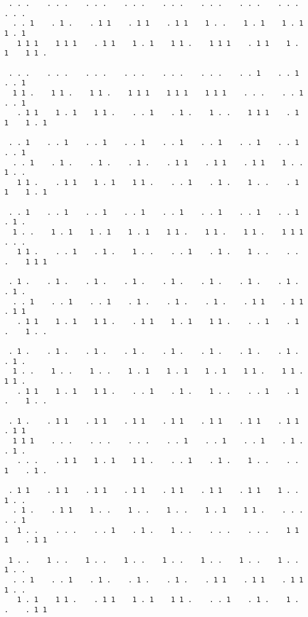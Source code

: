 {\small\bf
\begin{verbatim}
 . . .    . . .    . . .    . . .    . . .    . . .    . . .    . . .    . . .   
  . . 1    . 1 .    . 1 1    . 1 1    . 1 1    1 . .    1 . 1    1 . 1    1 . 1   
   1 1 1    1 1 1    . 1 1    1 . 1    1 1 .    1 1 1    . 1 1    1 . 1    1 1 .   

 . . .    . . .    . . .    . . .    . . .    . . .    . . 1    . . 1    . . 1   
  1 1 .    1 1 .    1 1 .    1 1 1    1 1 1    1 1 1    . . .    . . 1    . . 1   
   . 1 1    1 . 1    1 1 .    . . 1    . 1 .    1 . .    1 1 1    . 1 1    1 . 1   

 . . 1    . . 1    . . 1    . . 1    . . 1    . . 1    . . 1    . . 1    . . 1   
  . . 1    . 1 .    . 1 .    . 1 .    . 1 1    . 1 1    . 1 1    1 . .    1 . .   
   1 1 .    . 1 1    1 . 1    1 1 .    . . 1    . 1 .    1 . .    . 1 1    1 . 1   

 . . 1    . . 1    . . 1    . . 1    . . 1    . . 1    . . 1    . . 1    . 1 .   
  1 . .    1 . 1    1 . 1    1 . 1    1 1 .    1 1 .    1 1 .    1 1 1    . . .   
   1 1 .    . . 1    . 1 .    1 . .    . . 1    . 1 .    1 . .    . . .    1 1 1   

 . 1 .    . 1 .    . 1 .    . 1 .    . 1 .    . 1 .    . 1 .    . 1 .    . 1 .   
  . . 1    . . 1    . . 1    . 1 .    . 1 .    . 1 .    . 1 1    . 1 1    . 1 1   
   . 1 1    1 . 1    1 1 .    . 1 1    1 . 1    1 1 .    . . 1    . 1 .    1 . .   

 . 1 .    . 1 .    . 1 .    . 1 .    . 1 .    . 1 .    . 1 .    . 1 .    . 1 .   
  1 . .    1 . .    1 . .    1 . 1    1 . 1    1 . 1    1 1 .    1 1 .    1 1 .   
   . 1 1    1 . 1    1 1 .    . . 1    . 1 .    1 . .    . . 1    . 1 .    1 . .   

 . 1 .    . 1 1    . 1 1    . 1 1    . 1 1    . 1 1    . 1 1    . 1 1    . 1 1   
  1 1 1    . . .    . . .    . . .    . . 1    . . 1    . . 1    . 1 .    . 1 .   
   . . .    . 1 1    1 . 1    1 1 .    . . 1    . 1 .    1 . .    . . 1    . 1 .   

 . 1 1    . 1 1    . 1 1    . 1 1    . 1 1    . 1 1    . 1 1    1 . .    1 . .   
  . 1 .    . 1 1    1 . .    1 . .    1 . .    1 . 1    1 1 .    . . .    . . 1   
   1 . .    . . .    . . 1    . 1 .    1 . .    . . .    . . .    1 1 1    . 1 1   

 1 . .    1 . .    1 . .    1 . .    1 . .    1 . .    1 . .    1 . .    1 . .   
  . . 1    . . 1    . 1 .    . 1 .    . 1 .    . 1 1    . 1 1    . 1 1    1 . .   
   1 . 1    1 1 .    . 1 1    1 . 1    1 1 .    . . 1    . 1 .    1 . .    . 1 1   


\end{verbatim}}
